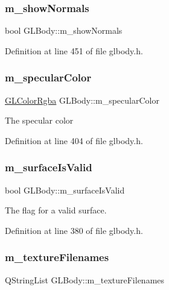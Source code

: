 \subsubsection{\texorpdfstring{m\_showNormals}{m\_showNormals}}
{\footnotesize\ttfamily bool G\+L\+Body\+::m\+\_\+show\+Normals\hspace{0.3cm}{\ttfamily [protected]}}



Definition at line 451 of file glbody.\+h.

\mbox{\label{class_g_l_body_ac9db9ed4eb8ca1fbf3e4113c530b92af}} 
\subsubsection{\texorpdfstring{m\_specularColor}{m\_specularColor}}
{\footnotesize\ttfamily \mbox{\hyperlink{class_g_l_color_rgba}{G\+L\+Color\+Rgba}} G\+L\+Body\+::m\+\_\+specular\+Color\hspace{0.3cm}{\ttfamily [protected]}}

The specular color 

Definition at line 404 of file glbody.\+h.

\mbox{\label{class_g_l_body_a518355cd5063cb8f7354065f2c521cbc}} 
\subsubsection{\texorpdfstring{m\_surfaceIsValid}{m\_surfaceIsValid}}
{\footnotesize\ttfamily bool G\+L\+Body\+::m\+\_\+surface\+Is\+Valid\hspace{0.3cm}{\ttfamily [protected]}}

The flag for a valid surface. 

Definition at line 380 of file glbody.\+h.

\mbox{\label{class_g_l_body_a51eed96c1bc0d06742d7a9ab455d527d}} 
\subsubsection{\texorpdfstring{m\_textureFilenames}{m\_textureFilenames}}
{\footnotesize\ttfamily Q\+String\+List G\+L\+Body\+::m\+\_\+texture\+Filenames\hspace{0.3cm}{\ttfamily [protected]}}

